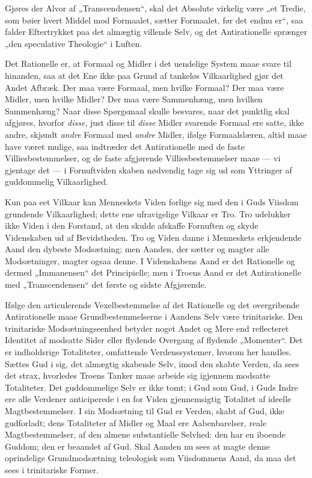 \documentclass[12pt]{book}
\begin{document}
Gjøres der Alvor af „Transcendensen“, skal det Absolute virkelig
være „et Tredie, som bøier hvert Middel mod Formaalet, sætter
Formaalet, før det endnu er“, saa falder Eftertrykket paa det
almægtig villende Selv, og det Antirationelle sprænger „den
speculative Theologie“ i Luften.

Det Rationelle er, at Formaal og Midler i det uendelige System maae
svare til hinanden, saa at det Ene ikke paa Grund af tankeløs
Vilkaarlighed gjør det Andet Afbræk. Der maa være Formaal, men
hvilke Formaal? Der maa være Midler, men hvilke Midler? Der maa være
Sammenhæng, men hvilken Sammenhæng? Naar disse Spørgsmaal skulle
besvares, naar det punktlig skal afgjøres, hvorfor \emph{disse},
just disse til \emph{disse} Midler svarende Formaal ere satte, ikke
andre, skjøndt \emph{andre} Formaal med \emph{andre} Midler, ifølge
Formaalslæren, altid maae have været mulige, saa indtræder det
Antirationelle med de faste Villiesbestemmelser, og de faste
afgjørende Villiesbestemmelser maae --- vi gjentage det --- i
Fornuftviden\-
skaben nødvendig tage sig ud som Yttringer af guddommelig
Vilkaarlighed.

Kun paa eet Vilkaar kan Menneskets Viden forlige sig med den i Guds
Viisdom grundende Vilkaarlighed; dette ene ufravigelige Vilkaar er
Tro. Tro udelukker ikke Viden i den Forstand, at den skulde afskaffe
Fornuften og skyde Videnskaben ud af Bevidstheden. Tro og Viden
danne i Menneskets erkjendende Aand den dybeste Modsætning; men
Aanden, der sætter og magter alle Modsætninger, magter ogsaa denne.
I Videnskabens Aand er det Rationelle og dermed „Immanensen“ det
Principielle; men i Troens Aand er det Antirationelle med
„Transcendensen“ det første og sidste Afgjørende.

Ifølge den articulerende Vexelbestemmelse af det Rationelle og det
overgribende Antirationelle maae Grundbestemmelserne i Aandens Selv
være trinitariske. Den trinitariske Modsætningseenhed betyder noget
Andet og Mere end reflecteret Identitet af modsatte Sider eller
flydende Overgang af flydende „Momenter“. Det er indholdsrige
Totaliteter, omfattende Verdenssystemer, hvorom her handles. Sættes
Gud i sig, det almægtig skabende Selv, imod den skabte Verden, da
sees det strax, hvorledes Troens Tanker maae arbeide sig igjennem
modsatte Totaliteter. Det guddommelige Selv er ikke tomt; i Gud som
Gud, i Guds Indre ere alle Verdener anticiperede i en for Viden
gjennemsigtig Totalitet af ideelle Magtbestemmelser. I sin
Modsætning til Gud er Verden, skabt af Gud, ikke gudforladt; dens
Totaliteter af Midler og Maal ere Aabenbarelser, reale
Magtbestemmelser, af den almene substantielle Selvhed: den har en
iboende Guddom; den er beaandet af Gud. Skal Aanden nu sees at magte
denne oprindelige Grundmodsætning teleologisk som Viisdommens Aand,
da maa det sees i trinitariske Former.
\end{document}
